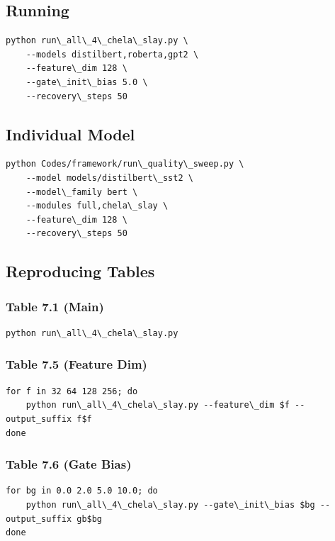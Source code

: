 \subsection{Running}

\begin{lstlisting}
python run\_all\_4\_chela\_slay.py \
    --models distilbert,roberta,gpt2 \
    --feature\_dim 128 \
    --gate\_init\_bias 5.0 \
    --recovery\_steps 50
\end{lstlisting}

\subsection{Individual Model}

\begin{lstlisting}
python Codes/framework/run\_quality\_sweep.py \
    --model models/distilbert\_sst2 \
    --model\_family bert \
    --modules full,chela\_slay \
    --feature\_dim 128 \
    --recovery\_steps 50
\end{lstlisting}

\subsection{Reproducing Tables}

\subsubsection{Table 7.1 (Main)}
\begin{lstlisting}
python run\_all\_4\_chela\_slay.py
\end{lstlisting}

\subsubsection{Table 7.5 (Feature Dim)}
\begin{lstlisting}
for f in 32 64 128 256; do
    python run\_all\_4\_chela\_slay.py --feature\_dim $f --output_suffix f$f
done
\end{lstlisting}

\subsubsection{Table 7.6 (Gate Bias)}
\begin{lstlisting}
for bg in 0.0 2.0 5.0 10.0; do
    python run\_all\_4\_chela\_slay.py --gate\_init\_bias $bg --output_suffix gb$bg
done
\end{lstlisting}

